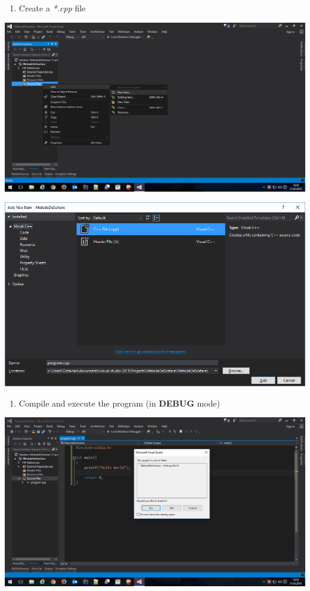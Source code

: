 \documentclass[../en-fa-lab.tex]{subfiles}
\begin{document}
\begin{enumerate}
\def\labelenumi{\arabic{enumi}.}
\setcounter{enumi}{3}
\item
  Create a \emph{*.cpp} file
\end{enumerate}

\includegraphics[width=\textwidth]{../Resources/lab0/image4.png}

\includegraphics[width=\textwidth]{../Resources/lab0/image5.png}

\begin{enumerate}
\def\labelenumi{\arabic{enumi}.}
\setcounter{enumi}{4}
\item
  Compile and execute the program (in \textbf{DEBUG} mode)
\end{enumerate}

\includegraphics[width=\textwidth]{../Resources/lab0/image6.png}
\end{document}
